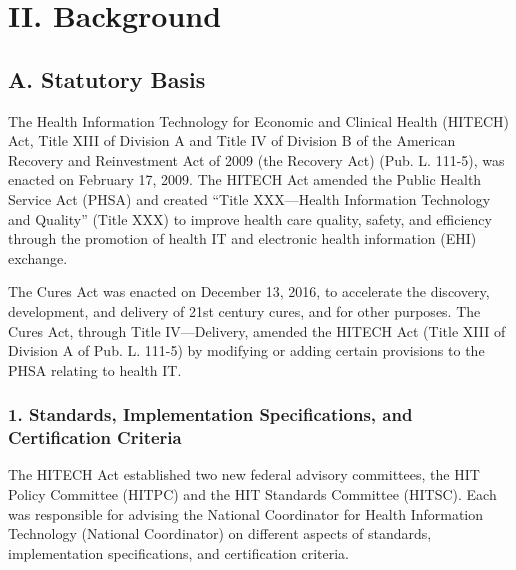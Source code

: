 \documentclass[twoside,11pt]{article}
\begin{document}
          \section{II. Background}

          \subsection{A. Statutory Basis}

          The Health Information Technology for Economic and Clinical Health (HITECH) Act, Title XIII of Division A and Title IV of Division B of the American Recovery and Reinvestment Act of 2009 (the Recovery Act) (Pub. L. 111-5), was enacted on February 17, 2009. The HITECH Act amended the Public Health Service Act (PHSA) and created “Title XXX—Health Information Technology and Quality” (Title XXX) to improve health care quality, safety, and efficiency through the promotion of health IT and electronic health information (EHI) exchange.


          The Cures Act was enacted on December 13, 2016, to accelerate the discovery, development, and delivery of 21st century cures, and for other purposes. The Cures Act, through Title IV—Delivery, amended the HITECH Act (Title XIII of Division A of Pub. L. 111-5) by modifying or adding certain provisions to the PHSA relating to health IT.


          \subsubsection{1. Standards, Implementation Specifications, and Certification Criteria}

          The HITECH Act established two new federal advisory committees, the HIT Policy Committee (HITPC) and the HIT Standards Committee (HITSC). Each was responsible for advising the National Coordinator for Health Information Technology (National Coordinator) on different aspects of standards, implementation specifications, and certification criteria.
\end{document}
